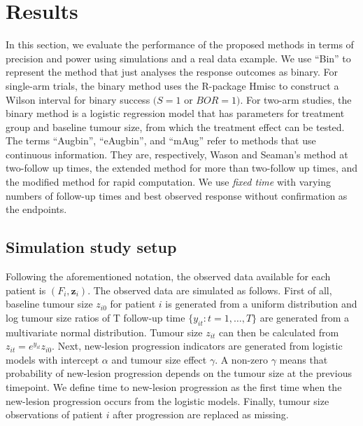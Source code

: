 \documentclass[10pt,A4]{article}
\begin{document}
\section{Results}\label{simulation}
In this section, we evaluate the performance of the proposed methods in terms of precision and power using simulations and a real data example. We use ``Bin'' to represent the method that just analyses the response outcomes as binary. For single-arm trials, the binary method uses the R-package Hmisc to construct a Wilson interval for binary success $(S=1$ or $BOR=1)$. For two-arm studies, the binary method is a logistic regression model that has parameters for treatment group and baseline tumour size, from which the treatment effect can be tested. The terms ``Augbin'', ``eAugbin'', and ``mAug'' refer to methods that use continuous information. They are, respectively, Wason and Seaman's method \cite{Wason2013} at two-follow up times, the extended method for more than two-follow up times, and the modified method for rapid computation. We use \textit{fixed time} with varying numbers of follow-up times and best observed response without confirmation as the endpoints.

\subsection{Simulation study setup}
Following the aforementioned notation, the observed data available for each patient is $(F_i, \textbf{z}_i)$. The observed data are simulated as follows. First of all, baseline tumour size $z_{i0}$ for patient $i$ is generated from a uniform distribution and log tumour size ratios of T follow-up time $\{y_{it}: t=1,\dots,T \}$ are generated from a multivariate normal distribution. Tumour size $z_{it}$ can then be calculated from $z_{it}=e^{y_{it}}z_{i0}$. Next, new-lesion progression indicators are generated from logistic models with intercept $\alpha$ and tumour size effect $\gamma$. A non-zero $\gamma$ means that probability of new-lesion progression depends on the tumour size at the previous timepoint. We define time to new-lesion progression as the first time when the new-lesion progression occurs from the logistic models. Finally, tumour size observations of patient $i$ after progression are replaced as missing. 
\end{document}
